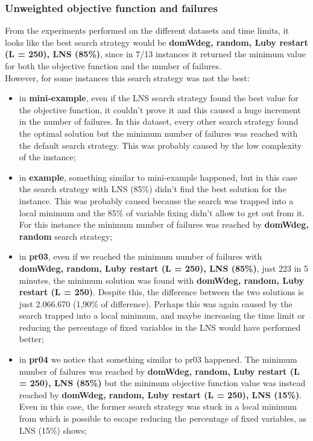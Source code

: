 \subsubsection{Unweighted objective function and failures}
\label{subsubsec:failures-unweighted-obj-fun}
From the experiments performed on the different datasets and time limits, it looks like the best search strategy would be \textbf{domWdeg, random, Luby restart (L = 250), LNS (85\%)}, since in 7/13 instances it returned the minimum value for both the objective function and the number of failures.\\
However, for some instances this search strategy was not the best:
\begin{itemize}
    \item in \textbf{mini-example}, even if the LNS search strategy found the best value for the objective function, it couldn't prove it and this caused a huge increment in the number of failures. In this dataset, every other search strategy found the optimal solution but the minimum number of failures was reached with the default search strategy. This was probably caused by the low complexity of the instance;
    \item in \textbf{example}, something similar to mini-example happened, but in this case the search strategy with LNS (85\%) didn't find the best solution for the instance. This was probably caused because the search was trapped into a local minimum and the 85\% of variable fixing didn't allow to get out from it. For this instance the minimum number of failures was reached by \textbf{domWdeg, random} search strategy;
    \item in \textbf{pr03}, even if we reached the minimum number of failures with \textbf{domWdeg, random, Luby restart (L = 250), LNS (85\%)}, just 223 in 5 minutes, the minimum solution was found with \textbf{domWdeg, random, Luby restart (L = 250)}. Despite this, the difference between the two solutions is just 2.066.670 (1,90\% of difference). Perhaps this was again caused by the search trapped into a local minimum, and maybe increasing the time limit or reducing the percentage of fixed variables in the LNS would have performed better;
    \item in \textbf{pr04} we notice that something similar to pr03 happened. The minimum number of failures was reached by \textbf{domWdeg, random, Luby restart (L = 250), LNS (85\%)} but the minimum objective function value was instead reached by \textbf{domWdeg, random, Luby restart (L = 250), LNS (15\%)}. Even in this case, the former search strategy was stuck in a local minimum from which is possible to escape reducing the percentage of fixed variables, as LNS (15\%) shows;

\end{itemize}
